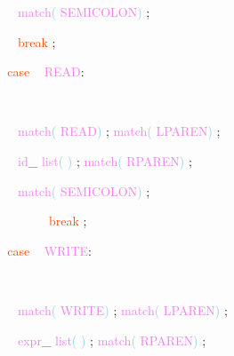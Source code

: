 \documentclass[8, usernames, dvipsnames]{beamer}
\begin{document}
\begin{frame}
 \textcolor{White}{\   }
\textcolor{White}{\   }
\textcolor{White}{\   }
\textcolor{Violet}{match}\textcolor{SkyBlue}{(}
\textcolor{Violet}{SEMICOLON}\textcolor{SkyBlue}{)}
\textcolor{Sepia}{;}

 \textcolor{White}{\   }
\textcolor{White}{\   }
\textcolor{White}{\   }
\textcolor{OrangeRed}{break}
\textcolor{Sepia}{;}

 \end{frame}
\begin{frame}
\textcolor{White}{\   }
\textcolor{White}{\   }
\textcolor{OrangeRed}{case}
\textcolor{White}{\ }
\textcolor{Violet}{READ}\textcolor{Sepia}{:}

 \textcolor{White}{\   }
\textcolor{White}{\   }

 \textcolor{White}{\   }
\textcolor{White}{\   }
\textcolor{White}{\   }
\textcolor{Violet}{match}\textcolor{SkyBlue}{(}
\textcolor{Violet}{READ}\textcolor{SkyBlue}{)}
\textcolor{Sepia}{;}
\textcolor{Violet}{match}\textcolor{SkyBlue}{(}
\textcolor{Violet}{LPAREN}\textcolor{SkyBlue}{)}
\textcolor{Sepia}{;}

 \textcolor{White}{\   }
\textcolor{White}{\   }
\textcolor{White}{\   }
\textcolor{Violet}{id}\textcolor{Sepia}{\_}
\textcolor{Violet}{list}\textcolor{SkyBlue}{(}
\textcolor{SkyBlue}{)}
\textcolor{Sepia}{;}
\textcolor{Violet}{match}\textcolor{SkyBlue}{(}
\textcolor{Violet}{RPAREN}\textcolor{SkyBlue}{)}
\textcolor{Sepia}{;}

 \textcolor{White}{\   }
\textcolor{White}{\   }
\textcolor{White}{\   }
\textcolor{Violet}{match}\textcolor{SkyBlue}{(}
\textcolor{Violet}{SEMICOLON}\textcolor{SkyBlue}{)}
\textcolor{Sepia}{;}

 \textcolor{White}{\   }
\textcolor{White}{\   }
\textcolor{White}{\   }
\textcolor{White}{\   }
\textcolor{White}{\   }
\textcolor{White}{\   }
\textcolor{OrangeRed}{break}
\textcolor{Sepia}{;}

 \textcolor{White}{\   }
\textcolor{White}{\   }
\textcolor{OrangeRed}{case}
\textcolor{White}{\ }
\textcolor{Violet}{WRITE}\textcolor{Sepia}{:}

 \textcolor{White}{\   }
\textcolor{White}{\   }

 \textcolor{White}{\   }
\textcolor{White}{\   }
\textcolor{White}{\   }
\textcolor{Violet}{match}\textcolor{SkyBlue}{(}
\textcolor{Violet}{WRITE}\textcolor{SkyBlue}{)}
\textcolor{Sepia}{;}
\textcolor{Violet}{match}\textcolor{SkyBlue}{(}
\textcolor{Violet}{LPAREN}\textcolor{SkyBlue}{)}
\textcolor{Sepia}{;}

 \textcolor{White}{\   }
\textcolor{White}{\   }
\textcolor{White}{\   }
\textcolor{Violet}{expr}\textcolor{Sepia}{\_}
\textcolor{Violet}{list}\textcolor{SkyBlue}{(}
\textcolor{SkyBlue}{)}
\textcolor{Sepia}{;}
\textcolor{Violet}{match}\textcolor{SkyBlue}{(}
\textcolor{Violet}{RPAREN}\textcolor{SkyBlue}{)}
\textcolor{Sepia}{;}

 \end{frame}
\end{document}
